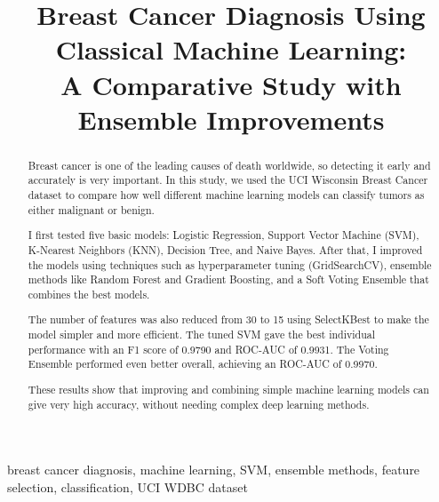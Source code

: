 \documentclass[conference]{IEEEtran}
\begin{document}
\title{Breast Cancer Diagnosis Using Classical Machine Learning:\\
       A Comparative Study with Ensemble Improvements}

\author{
}

\maketitle


\begin{abstract}
Breast cancer is one of the leading causes of death worldwide, so detecting it early and accurately is very important. In this study, we used the UCI Wisconsin Breast Cancer dataset to compare how well different machine learning models can classify tumors as either malignant or benign.

I first tested five basic models: Logistic Regression, Support Vector Machine (SVM), K-Nearest Neighbors (KNN), Decision Tree, and Naive Bayes. After that, I improved the models using techniques such as hyperparameter tuning (GridSearchCV), ensemble methods like Random Forest and Gradient Boosting, and a Soft Voting Ensemble that combines the best models.

The number of features was also reduced from 30 to 15 using SelectKBest to make the model simpler and more efficient. The tuned SVM gave the best individual performance with an F1 score of 0.9790 and ROC-AUC of 0.9931. The Voting Ensemble performed even better overall, achieving an ROC-AUC of 0.9970.

These results show that improving and combining simple machine learning models can give very high accuracy, without needing complex deep learning methods.
\end{abstract}

\begin{IEEEkeywords}
breast cancer diagnosis, machine learning, SVM, ensemble methods,
feature selection, classification, UCI WDBC dataset
\end{IEEEkeywords}
\end{document}
